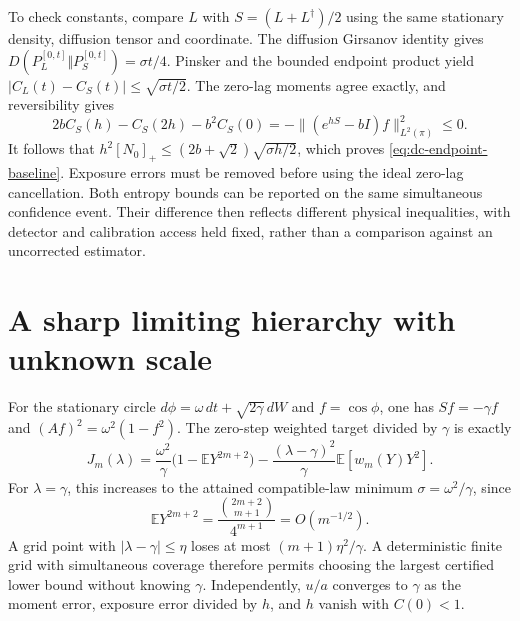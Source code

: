 To check constants, compare $L$ with $S=(L+L^\dagger)/2$ using the same
stationary density, diffusion tensor and coordinate.  The diffusion
Girsanov identity gives
$D(P_L^{[0,t]}\Vert P_S^{[0,t]})=\sigma t/4$.  Pinsker and the bounded
endpoint product yield
$|C_L(t)-C_S(t)|\le\sqrt{\sigma t/2}$.  The zero-lag moments agree exactly,
and reversibility gives
\[
 2bC_S(h)-C_S(2h)-b^2C_S(0)
   =-\|(e^{hS}-bI)f\|_{L^2(\pi)}^2\le0.
\]
It follows that $h^2[N_0]_+\le(2b+\sqrt2)\sqrt{\sigma h/2}$, which proves
\eqref{eq:dc-endpoint-baseline}.  Exposure errors must be removed before
using the ideal zero-lag cancellation.  Both entropy bounds can be reported
on the same simultaneous confidence event.  Their difference then reflects
different physical inequalities, with detector and calibration access held
fixed, rather than a comparison against an uncorrected estimator.

\section[Sharp limiting hierarchy]{A sharp limiting hierarchy with unknown scale}

For the stationary circle
$d\phi=\omega\,dt+\sqrt{2\gamma}\,dW$ and $f=\cos\phi$, one has
$Sf=-\gamma f$ and $(Af)^2=\omega^2(1-f^2)$.  The zero-step weighted target
divided by $\gamma$ is exactly
\begin{equation}
 J_m(\lambda)=\frac{\omega^2}{\gamma}
       \bigl(1-\mathbb EY^{2m+2}\bigr)
 -\frac{(\lambda-\gamma)^2}{\gamma}
       \mathbb E[w_m(Y)Y^2].
 \label{eq:dc-hierarchy}
\end{equation}
For $\lambda=\gamma$, this increases to the attained compatible-law minimum
$\sigma=\omega^2/\gamma$, since
\[
 \mathbb EY^{2m+2}
 =\frac{\binom{2m+2}{m+1}}{4^{m+1}}=O(m^{-1/2}).
\]
A grid point with $|\lambda-\gamma|\le\eta$ loses at most
$(m+1)\eta^2/\gamma$.  A deterministic finite grid with simultaneous
coverage therefore permits choosing the largest certified lower bound
without knowing $\gamma$.  Independently, $u/a$ converges to $\gamma$ as
the moment error, exposure error divided by $h$, and $h$ vanish with
$C(0)<1$.

